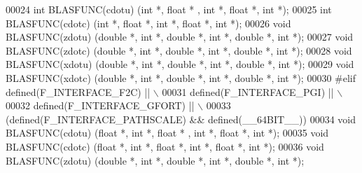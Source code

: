 \begin{DoxyCode}
00024 \textcolor{keywordtype}{int}   BLASFUNC(cdotu)  (\textcolor{keywordtype}{int} *, \textcolor{keywordtype}{float}  * , \textcolor{keywordtype}{int} *, \textcolor{keywordtype}{float}  *,  \textcolor{keywordtype}{int} *);
00025 \textcolor{keywordtype}{int}   BLASFUNC(cdotc)  (\textcolor{keywordtype}{int} *, \textcolor{keywordtype}{float}  *,  \textcolor{keywordtype}{int} *, \textcolor{keywordtype}{float}  *,  \textcolor{keywordtype}{int} *);
00026 \textcolor{keywordtype}{void}  BLASFUNC(zdotu)  (\textcolor{keywordtype}{double} *, \textcolor{keywordtype}{int} *, \textcolor{keywordtype}{double}  *, \textcolor{keywordtype}{int} *, \textcolor{keywordtype}{double}  *, \textcolor{keywordtype}{int} *);
00027 \textcolor{keywordtype}{void}  BLASFUNC(zdotc)  (\textcolor{keywordtype}{double} *, \textcolor{keywordtype}{int} *, \textcolor{keywordtype}{double}  *, \textcolor{keywordtype}{int} *, \textcolor{keywordtype}{double}  *, \textcolor{keywordtype}{int} *);
00028 \textcolor{keywordtype}{void}  BLASFUNC(xdotu)  (\textcolor{keywordtype}{double} *, \textcolor{keywordtype}{int} *, \textcolor{keywordtype}{double}  *, \textcolor{keywordtype}{int} *, \textcolor{keywordtype}{double}  *, \textcolor{keywordtype}{int} *);
00029 \textcolor{keywordtype}{void}  BLASFUNC(xdotc)  (\textcolor{keywordtype}{double} *, \textcolor{keywordtype}{int} *, \textcolor{keywordtype}{double}  *, \textcolor{keywordtype}{int} *, \textcolor{keywordtype}{double}  *, \textcolor{keywordtype}{int} *);
00030 \textcolor{preprocessor}{#elif  defined(F\_INTERFACE\_F2C) || \(\backslash\)}
00031 \textcolor{preprocessor}{     defined(F\_INTERFACE\_PGI) || \(\backslash\)}
00032 \textcolor{preprocessor}{     defined(F\_INTERFACE\_GFORT) || \(\backslash\)}
00033 \textcolor{preprocessor}{    (defined(F\_INTERFACE\_PATHSCALE) && defined(\_\_64BIT\_\_))}
00034 \textcolor{keywordtype}{void}  BLASFUNC(cdotu)  (\textcolor{keywordtype}{float} *,  \textcolor{keywordtype}{int} *, \textcolor{keywordtype}{float}  * , \textcolor{keywordtype}{int} *, \textcolor{keywordtype}{float}  *,  \textcolor{keywordtype}{int} *);
00035 \textcolor{keywordtype}{void}  BLASFUNC(cdotc)  (\textcolor{keywordtype}{float} *,  \textcolor{keywordtype}{int} *, \textcolor{keywordtype}{float}  *,  \textcolor{keywordtype}{int} *, \textcolor{keywordtype}{float}  *,  \textcolor{keywordtype}{int} *);
00036 \textcolor{keywordtype}{void}  BLASFUNC(zdotu)  (\textcolor{keywordtype}{double} *, \textcolor{keywordtype}{int} *, \textcolor{keywordtype}{double}  *, \textcolor{keywordtype}{int} *, \textcolor{keywordtype}{double}  *, \textcolor{keywordtype}{int} *);

\end{DoxyCode}
